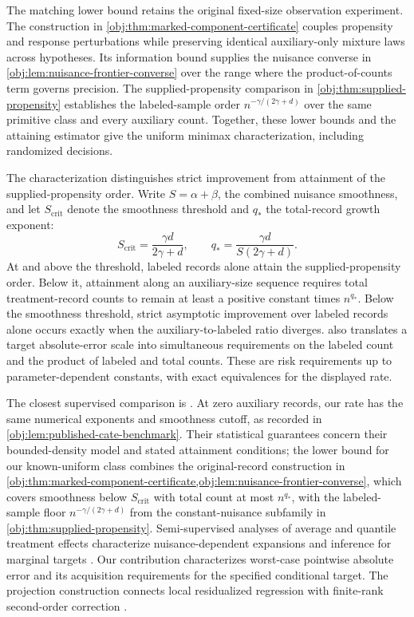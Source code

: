 The matching lower bound retains the original fixed-size observation experiment. The construction in \cref{obj:thm:marked-component-certificate} couples propensity and response perturbations while preserving identical auxiliary-only mixture laws across hypotheses. Its information bound supplies the nuisance converse in \cref{obj:lem:nuisance-frontier-converse} over the range where the product-of-counts term governs precision. The supplied-propensity comparison in \cref{obj:thm:supplied-propensity} establishes the labeled-sample order \(n^{-\gamma/(2\gamma+d)}\) over the same primitive class and every auxiliary count. Together, these lower bounds and the attaining estimator give the uniform minimax characterization, including randomized decisions.

The characterization distinguishes strict improvement from attainment of the supplied-propensity order. Write \(S=\alpha+\beta\), the combined nuisance smoothness, and let \(S_{\mathrm{crit}}\) denote the smoothness threshold and \(q_*\) the total-record growth exponent:
\[
S_{\mathrm{crit}}=\frac{\gamma d}{2\gamma+d},
\qquad
q_*=\frac{\gamma d}{S(2\gamma+d)}.
\]
At and above the threshold, labeled records alone attain the supplied-propensity order. Below it, attainment along an auxiliary-size sequence requires total treatment-record counts to remain at least a positive constant times \(n^{q_*}\). Below the smoothness threshold, strict asymptotic improvement over labeled records alone occurs exactly when the auxiliary-to-labeled ratio diverges.  also translates a target absolute-error scale into simultaneous requirements on the labeled count and the product of labeled and total counts. These are risk requirements up to parameter-dependent constants, with exact equivalences for the displayed rate.

The closest supervised comparison is \citet[Section 3, Theorems 1--2 and equation (14)]{KennedyBalakrishnanRobinsWasserman2024}. At zero auxiliary records, our rate has the same numerical exponents and smoothness cutoff, as recorded in \cref{obj:lem:published-cate-benchmark}. Their statistical guarantees concern their bounded-density model and stated attainment conditions; the lower bound for our known-uniform class combines the original-record construction in \cref{obj:thm:marked-component-certificate,obj:lem:nuisance-frontier-converse}, which covers smoothness below \(S_{\mathrm{crit}}\) with total count at most \(n^{q_*}\), with the labeled-sample floor \(n^{-\gamma/(2\gamma+d)}\) from the constant-nuisance subfamily in \cref{obj:thm:supplied-propensity}. Semi-supervised analyses of average and quantile treatment effects characterize nuisance-dependent expansions and inference for marginal targets \citep[Theorem 2.1, Corollary 2.1, Theorem 3.1, and Corollary 3.1]{ChakraborttyDai2022}. Our contribution characterizes worst-case pointwise absolute error and its acquisition requirements for the specified conditional target. The projection construction connects local residualized regression \citep[Theorem 3]{Kennedy2023} with finite-rank second-order correction \citep[Lemma 3]{Robins2009}.




